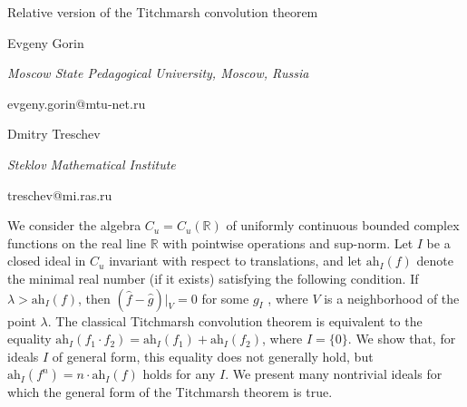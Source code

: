 \documentclass[10pt,a4paper]{article}
\def\R{\mathbb{R}}
\begin{document}
\begin{center}

{\Large Relative version of the Titchmarsh convolution theorem}

\bigskip

{\sc Evgeny Gorin}

{\small\it Moscow State Pedagogical University, Moscow, Russia}

{\small\rm evgeny.gorin@mtu-net.ru}

\bigskip

{\sc Dmitry Treschev}

{\small\it Steklov Mathematical Institute}

{\small\rm treschev@mi.ras.ru}

\end{center}

\bigskip


We consider the algebra
$C_u = C_u (\R)$
of uniformly continuous bounded complex functions on the real line $\R$
with pointwise operations and sup-norm. Let $I$ be a closed ideal in $C_u$
invariant with respect to translations, and let $\mathrm{ah}_I (f )$
denote the minimal real number (if it exists)
satisfying the following condition. If
$\lambda > \mathrm{ah}_I (f )$, then $(\hat f - \hat g )|_V = 0$
for some $g_I$ , where $V$ is
a neighborhood of the point $\lambda$.
The classical Titchmarsh convolution theorem is equivalent to the
equality
$\mathrm{ah}_I (f_1 \cdot f_2 ) = \mathrm{ah}_I (f_1 ) + \mathrm{ah}_I (f_2 )$,
where $I = \{0\}$.
We show that, for ideals $I$ of general
form, this equality does not generally hold,
but $\mathrm{ah}_I (f^n ) = n \cdot \mathrm{ah}_I (f )$ holds for any $I$.
We present
many nontrivial ideals for which the general form
of the Titchmarsh theorem is true.
\end{document}
